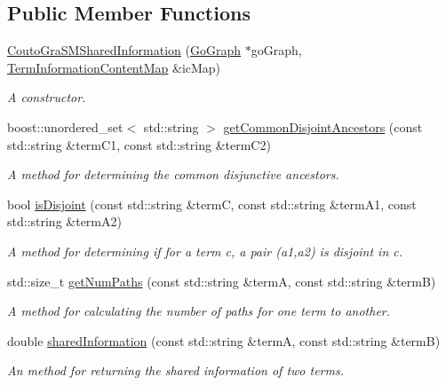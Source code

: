 \subsection*{Public Member Functions}
\begin{DoxyCompactItemize}
\item 
\hyperlink{classCoutoGraSMSharedInformation_a8e923a60f27eca7922a628a9efd7afdc}{Couto\+Gra\+S\+M\+Shared\+Information} (\hyperlink{classGoGraph}{Go\+Graph} $\ast$go\+Graph, \hyperlink{classTermInformationContentMap}{Term\+Information\+Content\+Map} \&ic\+Map)
\begin{DoxyCompactList}\small\item\em A constructor. \end{DoxyCompactList}\item 
boost\+::unordered\+\_\+set$<$ std\+::string $>$ \hyperlink{classCoutoGraSMSharedInformation_ac1dd8eacbfde6f724b11f4b276e41faf}{get\+Common\+Disjoint\+Ancestors} (const std\+::string \&term\+C1, const std\+::string \&term\+C2)
\begin{DoxyCompactList}\small\item\em A method for determining the common disjunctive ancestors. \end{DoxyCompactList}\item 
bool \hyperlink{classCoutoGraSMSharedInformation_aa935c6e99178b043fd4dbc8f2e4ba29d}{is\+Disjoint} (const std\+::string \&termC, const std\+::string \&term\+A1, const std\+::string \&term\+A2)
\begin{DoxyCompactList}\small\item\em A method for determining if for a term c, a pair (a1,a2) is disjoint in c. \end{DoxyCompactList}\item 
std\+::size\+\_\+t \hyperlink{classCoutoGraSMSharedInformation_abbb7cbdc8131eaab6d5b467fcb1ecd8a}{get\+Num\+Paths} (const std\+::string \&termA, const std\+::string \&termB)
\begin{DoxyCompactList}\small\item\em A method for calculating the number of paths for one term to another. \end{DoxyCompactList}\item 
double \hyperlink{classCoutoGraSMSharedInformation_aeb3ea4684e5f198464ce9354171981d3}{shared\+Information} (const std\+::string \&termA, const std\+::string \&termB)
\begin{DoxyCompactList}\small\item\em An method for returning the shared information of two terms. \end{DoxyCompactList}\item 

\end{DoxyCompactItemize}
